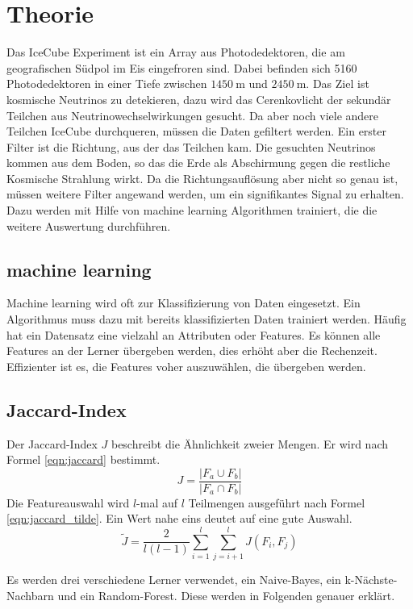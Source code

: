 \section{Theorie}
\label{sec:Theorie}
Das IceCube Experiment ist ein Array aus Photodedektoren, die am geografischen Südpol im Eis eingefroren sind. Dabei befinden sich 5160 Photodedektoren
in einer Tiefe zwischen $\SI{1450}{\meter}$ und $\SI{2450}{\meter}$. Das Ziel ist kosmische Neutrinos zu detekieren, dazu wird das Cerenkovlicht der sekundär
Teilchen aus Neutrinowechselwirkungen gesucht. Da aber noch viele andere Teilchen IceCube durchqueren, müssen die Daten gefiltert werden. Ein erster Filter ist die
Richtung, aus der das Teilchen kam. Die gesuchten Neutrinos kommen aus dem Boden, so das die Erde als Abschirmung gegen die restliche Kosmische Strahlung
wirkt. Da die Richtungsauflösung aber nicht so genau ist, müssen weitere Filter angewand werden, um ein signifikantes Signal zu erhalten. Dazu werden mit Hilfe
von machine learning Algorithmen trainiert, die die weitere Auswertung durchführen.
\subsection{machine learning}
Machine learning wird oft zur Klassifizierung von Daten eingesetzt. Ein Algorithmus muss dazu mit bereits klassifizierten Daten trainiert werden. Häufig hat ein
Datensatz eine vielzahl an Attributen oder Features. Es können alle Features an der Lerner übergeben werden, dies erhöht aber die Rechenzeit. Effizienter ist
es, die Features voher auszuwählen, die übergeben werden.
\subsection{Jaccard-Index}
Der Jaccard-Index $J$ beschreibt die Ähnlichkeit zweier Mengen. Er wird nach Formel \eqref{eqn:jaccard} bestimmt.
\begin{equation}
	J=\frac{|F_a \cup F_b|}{|F_a \cap F_b|}
	\label{eqn:jaccard}
\end{equation}
Die Featureauswahl wird $l$-mal auf $l$ Teilmengen ausgeführt nach Formel \eqref{eqn:jaccard_tilde}. Ein Wert nahe eins deutet auf eine gute Auswahl.
\begin{equation}
	\tilde{J} =\frac{2}{l(l-1)}\sum_{i=1}^l \sum_{j=i+1}^l J(F_i,F_j)
	\label{eqn:jaccard_tilde}
\end{equation}

Es werden drei verschiedene Lerner verwendet, ein Naive-Bayes, ein  k-Nächste-Nachbarn und ein Random-Forest. Diese werden in Folgenden genauer erklärt.
